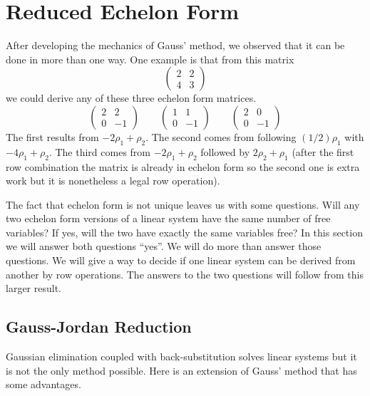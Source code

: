 \section{Reduced Echelon Form}
After developing the mechanics of Gauss' method, 
we observed that it can be done in more than one way.
One example is that from this matrix 
\begin{equation*}
    \begin{pmatrix}
       2  &2  \\
       4  &3
    \end{pmatrix}
\end{equation*}
we could derive any of these three echelon form matrices.
\begin{equation*}
    \begin{pmatrix}
       2  &2  \\
       0  &-1
    \end{pmatrix}
    \qquad
    \begin{pmatrix}
       1  &1  \\
       0  &-1
    \end{pmatrix}
    \qquad
    \begin{pmatrix}
       2  &0  \\
       0  &-1
    \end{pmatrix}
\end{equation*}
The first results from $-2\rho_1+\rho_2$.
The second comes from following $(1/2)\rho_1$ with $-4\rho_1+\rho_2$.
The third comes
from $-2\rho_1+\rho_2$ followed by $2\rho_2+\rho_1$
(after the first row combination the matrix is already in
echelon form so the second one is extra work 
but it is nonetheless a legal row operation).

The fact that echelon form 
is not unique leaves us with some questions.
Will any two echelon form versions of a linear system have the same number of
free variables?
If yes, 
will the two have exactly the same variables free?
In this section we will answer both questions ``yes''.
We will do more than answer those questions.
We will give a way to decide if one linear system 
can be derived from another by row operations.
The answers to the two questions will follow from this larger result.








\subsection{Gauss-Jordan Reduction}%
Gaussian elimination coupled with back-substitution
solves linear systems but it is not the only method possible.
Here is an extension of Gauss' method that has some advantages.

